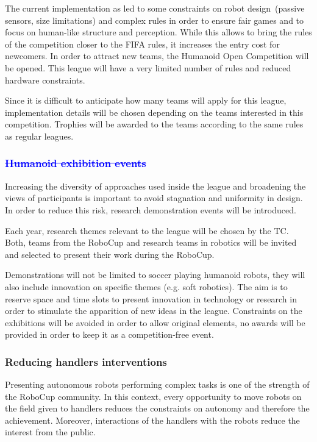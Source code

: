 \documentclass{article}
\newcommand{\removed}[1]{\textcolor{blue}{\sout{#1}}}
\newcommand{\added}[1]{{\color{magenta}{#1}}}
\DeclareRobustCommand{\hremoved}[1]{\texorpdfstring{\removed{#1}}{#1}}
\begin{document}
The current implementation as led to some constraints on robot design~(passive
sensors, size limitations) and complex rules in order to ensure fair games and
to focus on human-like structure and perception.
While this allows to bring the rules of the competition closer to the FIFA rules,
it increases the entry cost for newcomers.
In order to attract new teams, the Humanoid Open Competition will be opened.
This league will have a very limited number of rules and reduced hardware constraints.

Since it is difficult to anticipate how many teams will apply for this league,
implementation details will be chosen depending on the teams interested in this
competition.
Trophies will be awarded to the teams according to the same rules as regular leagues.

\subsubsection{\added{Humanoid Research Demonstration} \hremoved{Humanoid
    exhibition events}}

Increasing the diversity of approaches used inside the league and broadening the
views of participants is important to avoid stagnation and uniformity in design.
In order to reduce this risk, research demonstration events will be introduced.

Each year, research themes relevant to the league will be chosen by the TC.
Both, teams from the RoboCup and research teams in robotics will be
invited and selected to present their work during the RoboCup.

Demonstrations will not be limited to soccer playing humanoid robots, they will
also include innovation on specific themes (e.g. soft robotics).
The aim is to reserve space and time slots to present innovation in technology
or research in order to stimulate the apparition of new ideas in the league.
Constraints on the exhibitions will be avoided in order to allow original
elements, no awards will be provided in order to keep it as a competition-free
event.

\subsubsection{Reducing handlers interventions}
Presenting autonomous robots performing complex tasks is one of the strength of
the RoboCup community.
In this context, every opportunity to move robots on the field given to handlers
reduces the constraints on autonomy and therefore the achievement.
Moreover, interactions of the handlers with the robots reduce the interest from
the public.
\end{document}
